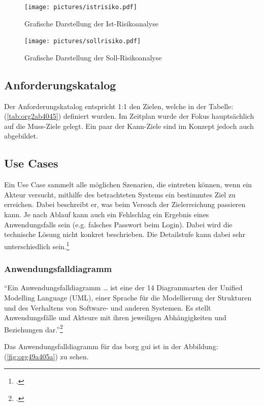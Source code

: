 \begin{figure}[H]
\centering
\texttt{[image: pictures/istrisiko.pdf]}
\caption{\label{fig:org2c84d03}
Grafische Darstellung der Ist-Risikoanalyse}
\end{figure}

\begin{figure}[H]
\centering
\texttt{[image: pictures/sollrisiko.pdf]}
\caption{\label{fig:org525577a}
Grafische Darstellung der Soll-Risikoanalyse}
\end{figure}

\newpage
\subsection{Anforderungskatalog}
\label{sec:org90be6e5}

Der Anforderungskatalog entspricht 1:1 den Zielen, welche in der
Tabelle:(\ref{tab:org2ab4045}) definiert wurden. Im Zeitplan wurde der Fokus
hauptsächlich auf die Muss-Ziele gelegt. Ein paar der Kann-Ziele sind im
Konzept jedoch auch abgebildet.

\subsection{Use Cases}
\label{sec:orgfd94eff}

Ein Use Case sammelt alle möglichen Szenarien, die eintreten können,
wenn ein Akteur versucht, mithilfe des betrachteten Systems ein
bestimmtes Ziel zu erreichen. Dabei beschreibt er, was beim Versuch der
Zielerreichung passieren kann. Je nach Ablauf kann auch ein Fehlschlag
ein Ergebnis eines Anwendungsfalls sein (e.g. falsches Passwort beim
Login). Dabei wird die technische Lösung nicht konkret beschrieben.
Die Detailstufe kann dabei sehr unterschiedlich sein.\footcite{usecase}

\subsubsection{Anwendungsfalldiagramm}
\label{sec:org1c2414b}

"`Ein Anwendungsfalldiagramm \ldots{} ist eine der 14 Diagrammarten der
Unified Modelling Language (UML), einer Sprache für die Modellierung
der Strukturen und des Verhaltens von Software- und anderen Systemen.
Es stellt Anwendungsfälle und Akteure mit ihren jeweiligen
Abhängigkeiten und Beziehungen dar."'\footcite{usecasediagramm}

Das Anwendungsfalldiagramm für das \gls{borg} \gls{gui} ist in der Abbildung:
(\ref{fig:org49a405a}) zu sehen.

